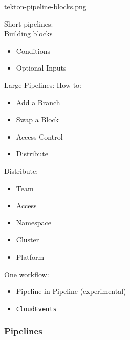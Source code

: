 \documentclass[aspectratio=169,11pt,hyperref={colorlinks=true}]{beamer}
\begin{document}
\begin{tpicstripedframe}%
  {tekton-pipeline-blocks.png}%
  {%
  Short pipelines: \\
  \vspace{0.03\paperheight}
  Building blocks
  \begin{itemize}
    \item Conditions
    \item Optional Inputs
  \end{itemize}
  }%
  {%
  Large Pipelines:
  \vspace{0.03\paperheight}
  How to:
  \small
  \begin{itemize}
    \item Add a Branch \\
    \item Swap a Block \\
    \item Access Control \\
    \item Distribute \\
  \end{itemize}
  }%
  {%
  Distribute:
  \vspace{0.03\paperheight}
  \begin{itemize}
    \item Team
    \item Access
    \item Namespace
    \item Cluster
    \item Platform
  \end{itemize}
  }%
  {%
  One workflow: \\
  \vspace{0.03\paperheight}
  \begin{itemize}
    \item Pipeline in Pipeline (experimental)
    \item \texttt{CloudEvents}
  \end{itemize}
  }%
  \frametitle{Pipelines}
\end{tpicstripedframe}
\end{document}
